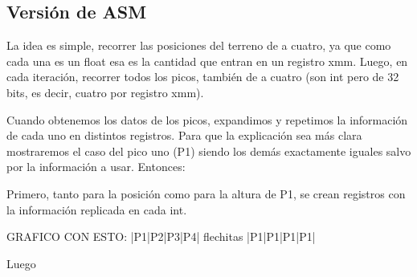 \subsection{Versión de ASM}
La idea es simple, recorrer las posiciones del terreno de a cuatro, ya que como cada una es un float esa es la cantidad que entran en un registro xmm. 
Luego, en cada iteración, recorrer todos los picos, también de a cuatro (son int pero de 32 bits, es decir, cuatro por registro xmm).

Cuando obtenemos los datos de los picos, expandimos y repetimos la información de cada uno en distintos registros. 
Para que la explicación sea más clara mostraremos el caso del pico uno (P1) siendo los demás exactamente iguales salvo por la información a usar. Entonces:

Primero, tanto para la posición como para la altura de P1, se crean registros con la información replicada en cada int.

GRAFICO CON ESTO:
|P1|P2|P3|P4|
flechitas
|P1|P1|P1|P1|

Luego

